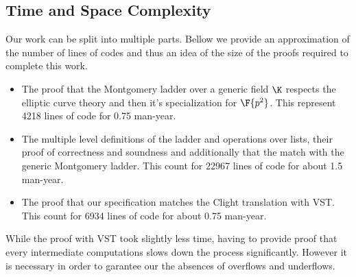 \subsection{Time and Space Complexity}

Our work can be split into multiple parts. Bellow we provide an approximation of
the number of lines of codes and thus an idea of the size of the proofs required to
complete this work.
\begin{itemize}
  \item The proof that the Montgomery ladder over a generic field $\K$ respects
  the elliptic curve theory and then it's specialization for $\F{p^2}$.
  This represent 4218 lines of code for 0.75 man-year.
  \item The multiple level definitions of the ladder and operations over lists,
  their proof of correctness and soundness and additionally that the match with
  the generic Montgomery ladder. This count for 22967 lines of code for about 1.5 man-year.
  \item The proof that our specification matches the Clight translation with VST.
  This count for 6934 lines of code for about 0.75 man-year.
\end{itemize}
While the proof with VST took slightly less time, having to provide proof that every
intermediate computations slows down the process significantly. However it is
necessary in order to garantee our the absences of overflows and underflows.
